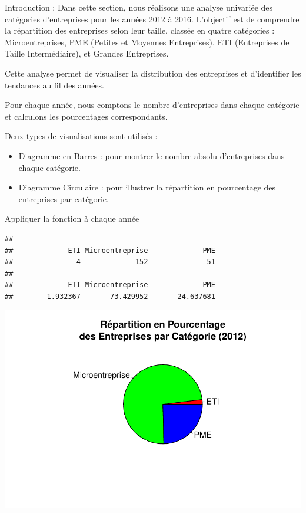 \documentclass[mstat,12pt]{unswthesis}
\begin{document}
\medskip

Introduction : Dans cette section, nous réalisons une analyse univariée
des catégories d'entreprises pour les années 2012 à 2016. L'objectif est
de comprendre la répartition des entreprises selon leur taille, classée
en quatre catégories : Microentreprises, PME (Petites et Moyennes
Entreprises), ETI (Entreprises de Taille Intermédiaire), et Grandes
Entreprises.

\medskip

Cette analyse permet de visualiser la distribution des entreprises et
d'identifier les tendances au fil des années. \medskip

Pour chaque année, nous comptons le nombre d'entreprises dans chaque
catégorie et calculons les pourcentages correspondants.

\medskip

Deux types de visualisations sont utilisés :

\medskip

\begin{itemize}
\tightlist
\item
  Diagramme en Barres : pour montrer le nombre absolu d'entreprises dans
  chaque catégorie.
\item
  Diagramme Circulaire : pour illustrer la répartition en pourcentage
  des entreprises par catégorie.
\end{itemize}

\newpage

Appliquer la fonction à chaque année

\begin{verbatim}
## 
##             ETI Microentreprise             PME 
##               4             152              51 
## 
##             ETI Microentreprise             PME 
##        1.932367       73.429952       24.637681
\end{verbatim}

\includegraphics{TDDT_projet_L_2_files/figure-latex/analyse_univariee_2012-1.pdf}
\end{document}

